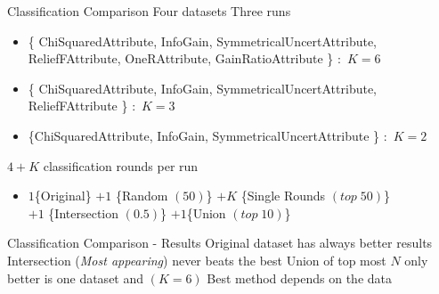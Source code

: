 \begin{frame}{Classification Comparison}
\bs
\bi
\mi Four datasets
\mi Three runs
\begin{itemize}
  \item \{ ChiSquaredAttribute, InfoGain,
SymmetricalUncertAttribute, ReliefFAttribute, OneRAttribute, GainRatioAttribute
\} $:$ $K=6$
\item \{ ChiSquaredAttribute, InfoGain,
SymmetricalUncertAttribute, ReliefFAttribute \} $:$ $K=3$
\item \{ChiSquaredAttribute, InfoGain,
SymmetricalUncertAttribute \} $:$ $K=2$
\end{itemize} 
\mi $4 + K$ classification rounds per run
\begin{itemize}
  \item $1$\{Original\} $+1$ \{Random $(50)$\} $+K$
\{Single Rounds $(top \; 50)$\}
\\
$+1$ \{Intersection $(0.5)$\} $+1$\{Union $(top \; 10)$\} 
\end{itemize}
 
\ei

\end{frame}


\begin{frame}{Classification Comparison - Results}
\bs
\bi
\mi Original dataset has always better results
\mi Intersection ({\it Most appearing}) never beats the best
\mi Union of top most $N$ only better is one dataset and $(K=6)$
\mi Best method depends on the data
 
\ei

\end{frame}